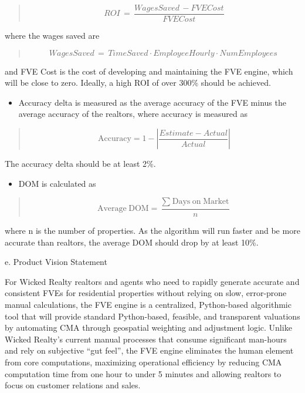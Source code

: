 \begin{quote}
\[ROI\, = \,\frac{WagesSaved\, - FVECost}{FVECost}\]
\end{quote}

where the wages saved are

\begin{quote}
\[WagesSaved\, = \, TimeSaved \cdot EmployeeHourly \cdot NumEmployees\ \]
\end{quote}

and FVE Cost is the cost of developing and maintaining the FVE engine,
which will be close to zero. Ideally, a high ROI of over 300\% should be
achieved.

\begin{itemize}
\item
  Accuracy delta is measured as the average accuracy of the FVE minus
  the average accuracy of the realtors, where accuracy is measured as
\end{itemize}

\begin{quote}
\[\text{Accuracy} = 1 - \left| \frac{Estimate - Actual}{Actual} \right|\]
\end{quote}

The accuracy delta should be at least 2\%.

\begin{itemize}
\item
  DOM is calculated as
\end{itemize}

\begin{quote}
\[\text{Average}\text{ }\text{DOM} = \frac{\sum_{\text{ }}^{\text{ }}\text{Days}\text{ }\text{on}\text{ }\text{Market}}{n}\]
\end{quote}

where n is the number of properties. As the algorithm will run faster
and be more accurate than realtors, the average DOM should drop by at
least 10\%.

e. Product Vision Statement

For Wicked Realty realtors and agents who need to rapidly generate
accurate and consistent FVEs for residential properties without relying
on slow, error-prone manual calculations, the FVE engine is a
centralized, Python-based algorithmic tool that will provide standard
Python-based, feasible, and transparent valuations by automating CMA
through geospatial weighting and adjustment logic. Unlike Wicked
Realty's current manual processes that consume significant man-hours and
rely on subjective ``gut feel'', the FVE engine eliminates the human
element from core computations, maximizing operational efficiency by
reducing CMA computation time from one hour to under 5 minutes and
allowing realtors to focus on customer relations and sales.

